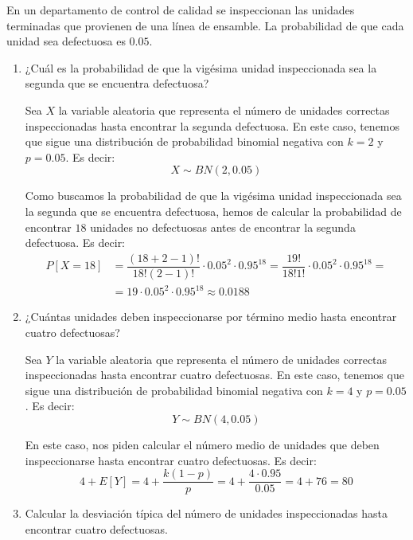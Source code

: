 \begin{ejercicio}
    En un departamento de control de calidad se inspeccionan las unidades terminadas que provienen
    de una línea de ensamble. La probabilidad de que cada unidad sea defectuosa es $0.05$.
    \begin{enumerate}
        \item ¿Cuál es la probabilidad de que la vigésima unidad inspeccionada sea la segunda que se encuentra defectuosa?
        
        Sea $X$ la variable aleatoria que representa el número de unidades correctas inspeccionadas hasta encontrar la segunda defectuosa. En este caso, tenemos que sigue una distribución de probabilidad binomial negativa con $k=2$ y $p=0.05$. Es decir:
        \begin{equation*}
            X \sim BN(2,0.05)
        \end{equation*}

        Como buscamos la probabilidad de que la vigésima unidad inspeccionada sea la segunda que se encuentra defectuosa, hemos de calcular la probabilidad de
        encontrar $18$ unidades no defectuosas antes de encontrar la segunda defectuosa. Es decir:
        \begin{align*}
            P[X=18] &= \dfrac{(18+2-1)!}{18!(2-1)!} \cdot 0.05^2 \cdot 0.95^{18} = \dfrac{19!}{18!1!} \cdot 0.05^2 \cdot 0.95^{18} =\\
            &= 19 \cdot 0.05^2 \cdot 0.95^{18} \approx 0.0188
        \end{align*}
        \item ¿Cuántas unidades deben inspeccionarse por término medio hasta encontrar cuatro defectuosas?
        
        Sea $Y$ la variable aleatoria que representa el número de unidades correctas inspeccionadas hasta encontrar cuatro defectuosas. En este caso, tenemos que sigue una distribución de probabilidad binomial negativa con $k=4$ y $p=0.05$. Es decir:
        \begin{equation*}
            Y \sim BN(4,0.05)
        \end{equation*}

        En este caso, nos piden calcular el número medio de unidades que deben inspeccionarse hasta encontrar cuatro defectuosas. Es decir:
        \begin{equation*}
            4 + E[Y] = 4+ \dfrac{k(1-p)}{p} = 4 + \dfrac{4\cdot 0.95}{0.05} = 4+76=80
        \end{equation*}
        \item Calcular la desviación típica del número de unidades inspeccionadas hasta encontrar cuatro
        defectuosas.


\end{enumerate}
\end{ejercicio}

